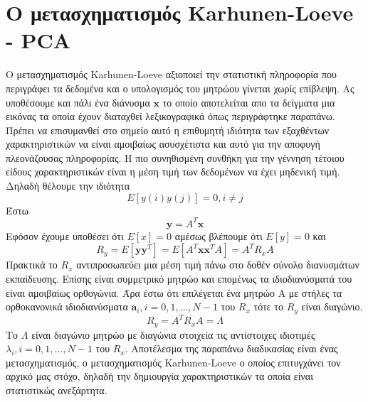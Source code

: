 \section{Ο μετασχηματισμός \textlatin{Karhunen-Loeve} - \textlatin{PCA}}
\par
Ο μετασχηματισμός \textlatin{Karhunen-Loeve} αξιοποιεί την στατιστική πληροφορία που περιγράφει τα δεδομένα και ο υπολογισμός του μητρώου γίνεται χωρίς επίβλεψη. Ας υποθέσουμε και πάλι ένα διάνυσμα $\mathbf{x}$ το οποίο αποτελείται απο τα δείγματα μια εικόνας τα οποία έχουν διαταχθεί λεξικογραφικά όπως περιγράφτηκε παραπάνω. Πρέπει να επισυμανθεί στο σημείο αυτό η επιθυμητή ιδιότητα των εξαχθέντων χαρακτηριστικών να είναι αμοιβαίως ασυσχέτιστα και αυτό για την αποφυγή πλεονάζουσας πληροφορίας. Η πιο συνηθισμένη συνθήκη για την γέννηση τέτοιου είδους χαρακτηριστικών είναι η μέση τιμή των δεδομένων να έχει μηδενική τιμή. Δηλαδή θέλουμε την ιδιότητα
\newline\hspace*{\fill}
\begin{equation}
        Ε[y(i)y(j)]=0,i \neq j
\end{equation}
\hspace*{\fill}\newline
Έστω 
\newline\hspace*{\fill}
\begin{equation}
        \mathbf{y} = A^{T}\mathbf{x}
\end{equation}
\hspace*{\fill}\newline
Εφόσον έχουμε υποθέσει ότι $Ε[x]=0$ αμέσως βλέπουμε ότι $Ε[y]=0$ και 
\newline\hspace*{\fill}
\begin{equation}
        R_{y}=E[\mathbf{y}\mathbf{y}^{T}]=E[A^{T} \mathbf{x}\mathbf{x}^{T} A]=A^{T}R_{x}A
\end{equation}
\hspace*{\fill}\newline
Πρακτικά το $R_{x}$ αντιπροσωπεύει μια μέση τιμή πάνω στο δοθέν σύνολο διανυσμάτων εκπαίδευσης. Επίσης είναι συμμετρικό μητρώο και επομένως τα ιδιοδιανύσματά του είναι αμοιβαίως ορθογώνια. Άρα έστω ότι επιλέγεται ένα μητρώο Α με στήλες τα ορθοκανονικά ιδιοδιανύσματα $\mathbf{a}_{i},i=0,1,\ldots,N-1$ του $R_{x}$  τότε το $R_{y}$ είναι διαγώνιο.
\newline\hspace*{\fill}
\begin{equation}
        R_{y}=A^{T}R_{x}A=\Lambda
\end{equation}
\hspace*{\fill}\newline
Το $\Lambda$ είναι διαγώνιο μητρώο με διαγώνια στοιχεία τις αντίστοιχες ιδιοτιμές $\lambda_{i},i=0,1,\ldots,N-1$ του $R_{x}$. Αποτέλεσμα της παραπάνω διαδικασίας είναι ένας μετασχηματισμός, ο μετασχηματισμός \textlatin{Karhunen-Loeve} ο οποίος επιτυγχάνει τον αρχικό μας στόχο, δηλαδή την δημιουργία χαρακτηριστικών τα οποία είναι στατιστικώς ανεξάρτητα.

